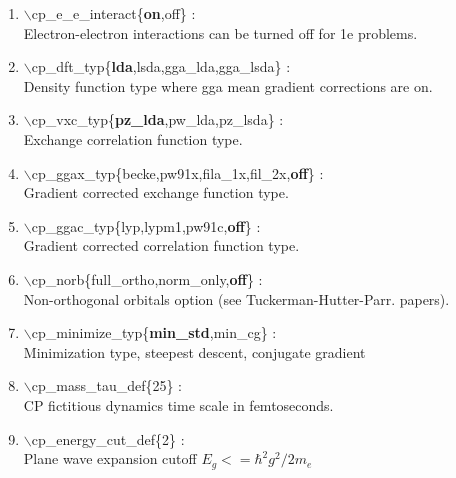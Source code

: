 \documentclass[12pt,titlepage]{article}
\begin{document}
\begin{enumerate}

 \vspace{0.15in} 
 \item  $\backslash$cp\_e\_e\_interact\{{\bf on},off\} : \\
     Electron-electron interactions can be turned off for 1e problems.

 \vspace{0.15in} 
 \item  $\backslash$cp\_dft\_typ\{{\bf lda},lsda,gga\_lda,gga\_lsda\} : \\
     Density function type where gga mean gradient corrections are on.

 \vspace{0.15in} 
 \item  $\backslash$cp\_vxc\_typ\{{\bf pz\_lda},pw\_lda,pz\_lsda\} : \\
     Exchange correlation function type.

 \vspace{0.15in} 
 \item  $\backslash$cp\_ggax\_typ\{becke,pw91x,fila\_1x,fil\_2x,{\bf off}\} : \\
     Gradient corrected exchange function type.

 \vspace{0.15in} 
 \item  $\backslash$cp\_ggac\_typ\{lyp,lypm1,pw91c,{\bf off}\} : \\
     Gradient corrected correlation function type.

 \vspace{0.15in} 
 \item  $\backslash$cp\_norb\{full\_ortho,norm\_only,{\bf off}\} : \\
     Non-orthogonal orbitals option (see Tuckerman-Hutter-Parr. papers).

 \vspace{0.15in} 
 \item  $\backslash$cp\_minimize\_typ\{{\bf min\_std},min\_cg\} : \\
      Minimization type, steepest descent, conjugate gradient 

 \vspace{0.15in} 
 \item  $\backslash$cp\_mass\_tau\_def\{25\} : \\
      CP fictitious dynamics time scale in femtoseconds.

 \vspace{0.15in} 
 \item  $\backslash$cp\_energy\_cut\_def\{2\} : \\
      Plane wave expansion cutoff $E_g<=\hbar^2g^2/2m_e$ 


\end{enumerate}
\end{document}
